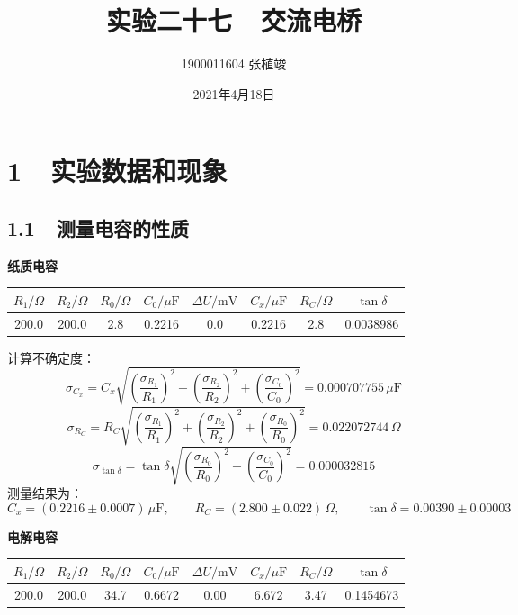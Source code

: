 \documentclass[a4paper,fontset=windows]{ctexart}
\begin{document}
    \title{\textbf{实验二十七\ \ 交流电桥}}
    \author{1900011604 张植竣}
    \date{2021年4月18日}

    \maketitle

    \section*{1\ \ 实验数据和现象}

    \subsection*{1.1\ \ 测量电容的性质}

    \textbf{纸质电容}

    \begin{center}
    \begin{tabular}{|c|c|c|c|c|c|c|c|}
        \hline
        $R_1/\Omega$ & $R_2/\Omega$ & $R_0/\Omega$ & $C_0/\mu\mathrm{F}$ & $\Delta U/\mathrm{mV}$ & $C_x/\mu\mathrm{F}$ & $R_C/\Omega$ & $\tan\delta$ \\
        \hline
        200.0 & 200.0 & 2.8 & 0.2216 & 0.0 & 0.2216 & 2.8 & 0.0038986 \\
        \hline
    \end{tabular}
    \end{center}

    计算不确定度：
    \[
    \sigma_{C_x} = C_x\sqrt{\left(\frac{\sigma_{R_1}}{R_1}\right)^2 + \left(\frac{\sigma_{R_2}}{R_2}\right)^2 + \left(\frac{\sigma_{C_0}}{C_0}\right)^2} = 0.000707755\,\mu\mathrm{F}
    \]
    \[
    \sigma_{R_C} = R_C\sqrt{\left(\frac{\sigma_{R_1}}{R_1}\right)^2 + \left(\frac{\sigma_{R_2}}{R_2}\right)^2 + \left(\frac{\sigma_{R_0}}{R_0}\right)^2} = 0.022072744\,\Omega
    \]
    \[
    \sigma_{\tan\delta} = \tan\delta\sqrt{\left(\frac{\sigma_{R_0}}{R_0}\right)^2 + \left(\frac{\sigma_{C_0}}{C_0}\right)^2} = 0.000032815
    \]
    测量结果为：
    \[
    C_x = (0.2216\pm0.0007)\,\mu\mathrm{F},\qquad
    R_C = (2.800\pm0.022)\,\Omega,\qquad
    \tan\delta = 0.00390\pm0.00003
    \]

    \textbf{电解电容}

    \begin{center}
    \begin{tabular}{|c|c|c|c|c|c|c|c|}
        \hline
        $R_1/\Omega$ & $R_2/\Omega$ & $R_0/\Omega$ & $C_0/\mu\mathrm{F}$ & $\Delta U/\mathrm{mV}$ & $C_x/\mu\mathrm{F}$ & $R_C/\Omega$ & $\tan\delta$ \\
        \hline
        200.0 & 200.0 & 34.7 & 0.6672 & 0.00 & 6.672 & 3.47 & 0.1454673 \\
        \hline
    \end{tabular}
    \end{center}
\end{document}
